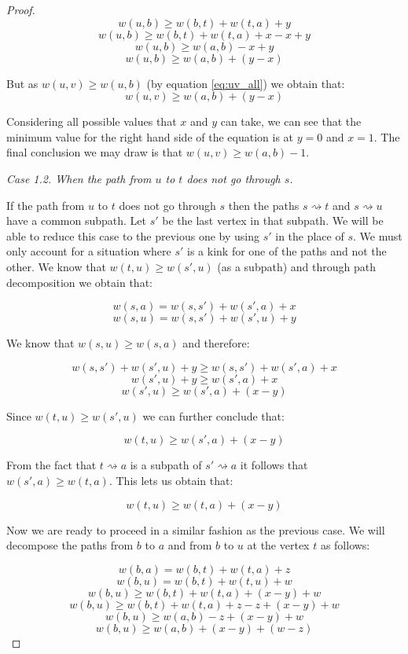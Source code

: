 \begin{proof}
$$ w(u, b) \ge w(b, t) + w(t, a) + y $$
$$ w(u, b) \ge w(b, t) + w(t, a) + x - x + y $$
$$ w(u, b) \ge w(a, b) - x + y $$
$$ w(u, b) \ge w(a, b) + (y - x) $$

But as $w(u, v) \ge w(u, b)$ (by equation \ref{eq:uv_all}) we obtain that:
$$ w(u, v) \ge w(a, b) + (y - x) $$

Considering all possible values that $x$ and $y$ can take, we can see that the minimum value for the right hand side of the equation is at $y = 0$ and $x = 1$. The final conclusion we may draw is that $w(u, v) \ge w(a, b) -1$.




{\em Case 1.2. When the path from $u$ to $t$ does not go through $s$.}

If the path from $u$ to $t$ does not go through $s$ then the paths $s \rightsquigarrow t$ and $s \rightsquigarrow u$ have a common subpath. Let $s'$ be the last vertex in that subpath. We will be able to reduce this case to the previous one by using $s'$ in the place of $s$. We must only account for a situation where $s'$ is a kink for one of the paths and not the other. We know that $w(t, u) \ge w(s', u)$ (as a subpath) and through path decomposition we obtain that:

$$ w(s, a) = w(s, s') + w(s', a) + x $$
$$ w(s, u) = w(s, s') + w(s', u) + y $$

We know that $w(s, u) \ge w(s, a)$ and therefore:

$$ w(s, s') + w(s', u) + y \ge w(s, s') + w(s', a) + x  $$ 
$$ w(s', u) + y \ge w(s', a) + x $$ 
$$ w(s', u) \ge w(s', a) + (x - y)$$ 

Since $w(t, u) \ge w(s', u)$ we can further conclude that:

$$ w(t, u) \ge w(s', a) + (x - y)$$ 

From the fact that $t \rightsquigarrow a$ is a subpath of $s' \rightsquigarrow a$ it follows that $w(s', a) \ge w(t, a)$. This lets us obtain that:

$$ w(t, u) \ge w(t, a) + (x - y)$$ 

Now we are ready to proceed in a similar fashion as the previous case. We will decompose the paths from $b$ to $a$ and from $b$ to $u$ at the vertex $t$ as follows:

$$ w(b, a) = w(b, t) + w(t, a) + z  $$
$$ w(b, u) = w(b, t) + w(t, u) + w  $$
$$ w(b, u) \ge w(b, t) + w(t, a) + (x - y) + w $$
$$ w(b, u) \ge w(b, t) + w(t, a) + z - z + (x - y) + w $$
$$ w(b, u) \ge w(a, b) - z + (x - y) + w $$
$$ w(b, u) \ge w(a, b) + (x - y) + (w - z) $$


\end{proof}
